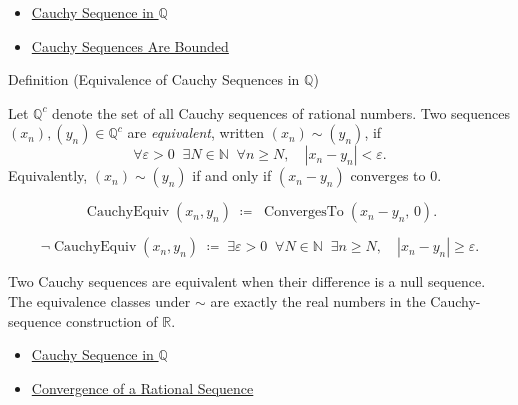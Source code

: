 \begin{remark*}[Dependencies]
\begin{itemize}
  \item \hyperref[def:cauchy-rational]{Cauchy Sequence in $\mathbb{Q}$}
  \item \hyperref[thm:cauchy-bounded-q]{Cauchy Sequences Are Bounded}
\end{itemize}
\end{remark*}

\begin{definitionbox}{Definition (Equivalence of Cauchy Sequences in $\mathbb{Q}$)}
\begin{definition}
\label{def:cauchy-equivalence}
Let $\mathbb{Q}^c$ denote the set of all Cauchy sequences of rational numbers.
Two sequences $(x_n), (y_n) \in \mathbb{Q}^c$ are \emph{equivalent}, written
$(x_n) \sim (y_n)$, if
\[
\forall \varepsilon > 0 \;\; \exists N \in \mathbb{N} \;\; \forall n \geq N,
\quad |x_n - y_n| < \varepsilon.
\]
Equivalently, $(x_n) \sim (y_n)$ if and only if $(x_n - y_n)$ converges to $0$.
\end{definition}
\end{definitionbox}

\begin{remark*}
\[
\operatorname{CauchyEquiv}(x_n, y_n)
\;\coloneqq\;
\operatorname{ConvergesTo}(x_n - y_n,\, 0).
\]
\end{remark*}

\begin{remark*}
\[
\neg\operatorname{CauchyEquiv}(x_n, y_n)
\;\coloneqq\;
\exists \varepsilon > 0 \;\; \forall N \in \mathbb{N} \;\; \exists n \geq N,
\quad |x_n - y_n| \geq \varepsilon.
\]
\end{remark*}

\begin{remark*}[Interpretation]
Two Cauchy sequences are equivalent when their difference is a null sequence.
The equivalence classes under $\sim$ are exactly the real numbers in the
Cauchy-sequence construction of $\mathbb{R}$.
\end{remark*}

\begin{remark*}[Dependencies]
\begin{itemize}
  \item \hyperref[def:cauchy-rational]{Cauchy Sequence in $\mathbb{Q}$}
  \item \hyperref[def:convergent-rational-sequence]{Convergence of a Rational Sequence}
\end{itemize}
\end{remark*}

